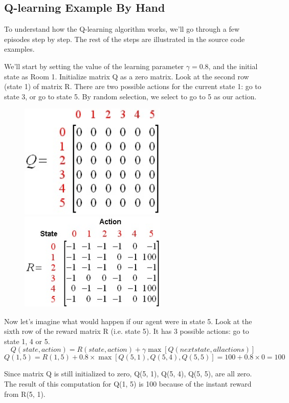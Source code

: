 \documentclass[a4paper, 11pt]{article}
\begin{document}
\subsection{Q-learning Example By Hand}
To understand how the Q-learning algorithm works, we'll go through a few episodes step by step. The rest of the steps are illustrated in the source code examples.

We'll start by setting the value of the learning parameter $\gamma=0.8$, and the initial state as Room 1. Initialize matrix Q as a zero matrix. Look at the second row (state 1) of matrix R.  There are two possible actions for the current state 1: go to state 3, or go to state 5. By random selection, we select to go to 5 as our action.

\begin{figure}[H]
\centering
\includegraphics[width=7cm]{fig/q_matrix1}
\quad
\includegraphics[width=7cm]{fig/r_matrix1}
\end{figure}
Now let's imagine what would happen if our agent were in state 5.  Look at the sixth row of the reward matrix R (i.e. state 5).  It has 3 possible actions: go to state 1, 4 or 5.
$$Q(state, action) = R(state, action) + \gamma\max[Q(next state, all actions)]$$
$$Q(1, 5) = R(1, 5) + 0.8\times\max[Q(5, 1), Q(5, 4), Q(5, 5)] = 100 + 0.8\times 0 = 100$$

Since matrix Q is still initialized to zero, Q(5, 1), Q(5, 4), Q(5, 5), are all zero.  The result of this computation for Q(1, 5) is 100 because of the instant reward from R(5, 1).
\end{document}
